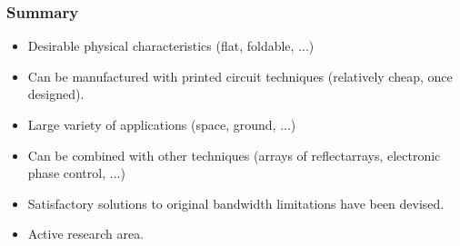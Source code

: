 
\begin{frame}
\frametitle{Summary}

\begin{itemize}
\item Desirable physical characteristics (flat, foldable, ...)
\item Can be manufactured with printed circuit techniques (relatively cheap, once designed).
\item Large variety of applications (space, ground, ...)
\item Can be combined with other techniques (arrays of reflectarrays, electronic phase control, ...)
\item Satisfactory solutions to original bandwidth limitations have been devised.
\item Active research area.
\end{itemize}

\end{frame}
